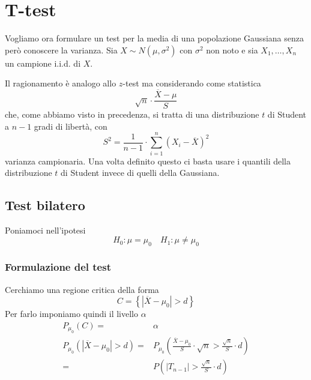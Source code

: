 \section{T-test}
Vogliamo ora formulare un test per la media di una popolazione Gaussiana senza però conoscere la
varianza. Sia $X \sim N(\mu, \sigma^2)$ con $\sigma^2$ non noto e sia $X_1, \dots, X_n$ un campione
i.i.d. di $X$.

Il ragionamento è analogo allo $z$-test ma considerando come statistica
\[ \sqrt{n} \cdot \frac{\overline{X} - \mu}{S} \]
che, come abbiamo visto in precedenza, si tratta di una distribuzione $t$ di Student a $n-1$ gradi
di libertà, con
\[ S^2 = \frac{1}{n-1} \cdot \sum_{i=1}^n \left( X_i - \overline{X} \right)^2 \]
varianza campionaria. Una volta definito questo ci basta usare i quantili della distribuzione $t$
di Student invece di quelli della Gaussiana.

\subsection{Test bilatero}
Poniamoci nell'ipotesi
\[ H_0: \mu = \mu_0 \quad H_1: \mu \neq \mu_0 \]

\subsubsection{Formulazione del test}
Cerchiamo una regione critica della forma
\[ C = \left\{ |\overline{X} - \mu_0| > d \right\} \]
Per farlo imponiamo quindi il livello $\alpha$
\begin{align*}
	P_{\mu_0} (C) =                          & \alpha \\
	P_{\mu_0} (|\overline{X} - \mu_0| > d) = &
	P_{\mu_0} \left( \frac{\overline{X} - \mu_0}{S} \cdot \sqrt{n} >
	\frac{\sqrt{n}}{S} \cdot d \right)                \\
	=                                        &
	P \left( |T_{n-1}| > \frac{\sqrt{n}}{S} \cdot d \right)
\end{align*}